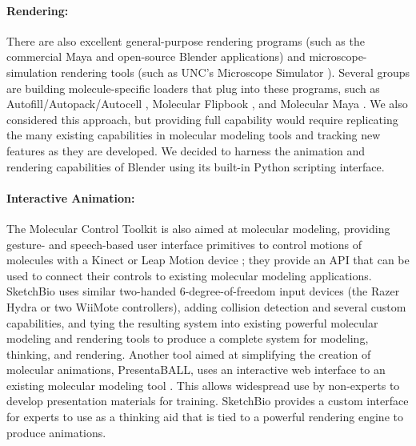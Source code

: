 \documentclass[twocolumn]{bmcart}%
\begin{document}
\paragraph*{Rendering:}
There are also excellent general-purpose rendering programs (such as the commercial Maya and open-source Blender applications) and microscope-simulation rendering tools (such as UNC's Microscope Simulator \cite{quammen2008}).  Several groups are building molecule-specific loaders that plug into these programs, such as Autofill/Autopack/Autocell \cite{Johnson2013}, Molecular Flipbook \cite{flipbook2013}, and Molecular Maya \cite{molecularmaya}.  We also considered this approach, but providing full capability would require replicating the many existing capabilities in molecular modeling tools and tracking new features as they are developed.  We decided to harness the animation and rendering capabilities of Blender using its built-in Python scripting interface.

\paragraph*{Interactive Animation:}
The Molecular Control Toolkit \cite{sabirmolecular} is also aimed at molecular modeling, providing gesture- and speech-based user interface primitives to control motions of molecules with a Kinect or Leap Motion device \cite{sabirmolecular}; they provide an API that can be used to connect their controls to existing molecular modeling applications.  SketchBio uses similar two-handed 6-degree-of-freedom input devices (the Razer Hydra or two WiiMote controllers), adding collision detection and several custom capabilities, and tying the resulting system into existing powerful molecular modeling and rendering tools to produce a complete system for modeling, thinking, and rendering.  Another tool aimed at simplifying the creation of molecular animations, PresentaBALL\cite{nickelspresentaball}, uses an interactive web interface to an existing molecular modeling tool \cite{nickelspresentaball}.  This allows widespread use by non-experts to develop presentation materials for training.  SketchBio provides a custom interface for experts to use as a thinking aid that is tied to a powerful rendering engine to produce animations.
\end{document}

